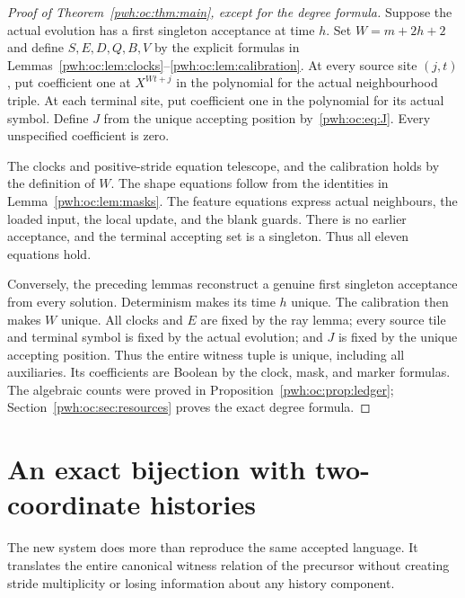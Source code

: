 \documentclass[11pt,letterpaper]{article}
\numberwithin{equation}{section}
\theoremstyle{definition}
\begin{document}
\begin{proof}[Proof of Theorem~\ref{pwh:oc:thm:main}, except for the degree formula]
Suppose the actual evolution has a first singleton acceptance at time $h$.
Set $W=m+2h+2$ and define $S,E,D,Q,B,V$ by the explicit formulas in
Lemmas~\ref{pwh:oc:lem:clocks}--\ref{pwh:oc:lem:calibration}. At every source site
$(j,t)$, put coefficient one at $X^{Wt+j}$ in the polynomial for the
actual neighbourhood triple. At each terminal site, put coefficient one
in the polynomial for its actual symbol. Define $J$ from the unique
accepting position by~\eqref{pwh:oc:eq:J}. Every unspecified coefficient is zero.

The clocks and positive-stride equation telescope, and the calibration
holds by the definition of $W$. The shape equations follow from the
identities in Lemma~\ref{pwh:oc:lem:masks}. The feature equations express actual
neighbours, the loaded input, the local update, and the blank guards.
There is no earlier acceptance, and the terminal accepting set is a
singleton. Thus all eleven equations hold.

Conversely, the preceding lemmas reconstruct a genuine first singleton
acceptance from every solution. Determinism makes its time $h$ unique.
The calibration then makes $W$ unique. All clocks and $E$ are fixed by
the ray lemma; every source tile and terminal symbol is fixed by the
actual evolution; and $J$ is fixed by the unique accepting position.
Thus the entire witness tuple is unique, including all auxiliaries.
Its coefficients are Boolean by the clock, mask, and marker formulas.
The algebraic counts were proved in Proposition~\ref{pwh:oc:prop:ledger};
Section~\ref{pwh:oc:sec:resources} proves the exact degree formula.
\end{proof}

\section{An exact bijection with two-coordinate histories}
\label{pwh:oc:sec:bijection}

The new system does more than reproduce the same accepted language. It
translates the entire canonical witness relation of the precursor without
creating stride multiplicity or losing information about any history
component.
\end{document}
